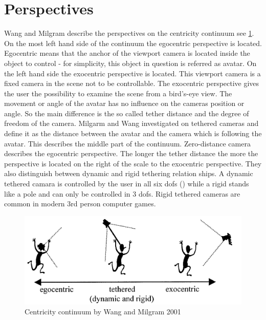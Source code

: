 \section{Perspectives}
Wang and Milgram \todo describe the perspectives on the centricity continuum see \ref{fig:ego-exo-cont}. On the most left hand side of the continuum the egocentric perspective is located. Egocentric means that the anchor of the viewport camera is located inside the object to control - for simplicity, this object in question is referred as avatar. On the left hand side the exocentric perspective is located. This viewport camera is a fixed camera in the scene not to be controllable. The exocentric perspective gives the user the possibility to examine the scene from a bird's-eye view. The movement or angle of the avatar has no influence on the cameras position or angle. So the main difference is the so called tether distance and the degree of freedom of the camera. Milgarm and Wang investigated on tethered cameras and define it as the distance between the avatar and the camera which is following the avatar. This describes the middle part of the continuum. Zero-distance camera describes the egocentric perspective. The longer the tether distance the more the perspective is located on the right of the scale to the exocentric perspective. They also distinguish between dynamic and rigid tethering relation ships. A dynamic tethered camara is controlled by the user in all six dofs (\todo) while a rigid stands like a pole and can only be controlled in 3 dofs. Rigid tethered cameras are common in modern 3rd person computer games.
\begin{figure}
	\centering
		\includegraphics[width=1.0\textwidth]{img/ego_exo_continuum_bigger.PNG}
	\caption{Centricity continuum by Wang and Milgram 2001 \todo}
	\label{fig:ego-exo-cont}
\end{figure}

